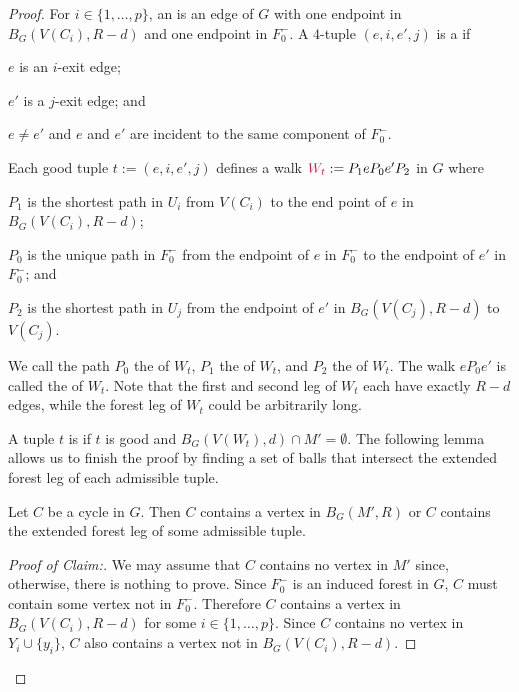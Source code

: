 \documentclass{patmorin}
\newcommand{\piotr}[1]{\textcolor{red}{Piotr: #1}}
\newenvironment{clmproof}{\begin{proof}[Proof of Claim:]\renewcommand{\qedsymbol}{\rule{1ex}{1ex}}}{\end{proof}}
\begin{document}
\begin{proof}
For $i\in\{1,\ldots,p\}$, an  is an edge of $G$ with one endpoint in $B_G(V(C_i),R-d)$ and one endpoint in $F_0^-$.
A $4$-tuple $(e,i,e',j)$ is a  if
\begin{compactitem}
  \item $e$ is an $i$-exit edge;
  \item $e'$ is a $j$-exit edge;
  and \item $e\neq e'$ and $e$ and $e'$ are incident to the same component of $F_0^-$.
\end{compactitem}
Each good tuple $t:=(e,i,e',j)$  defines a walk $\mathdefin{W_t}:=P_1eP_0e'P_2$ in $G$ where
\begin{compactitem}
  \item $P_1$ is the shortest path in $U_i$ from $V(C_i)$ to the end point of $e$ in $B_G(V(C_i),R-d)$;
  \item $P_0$ is the unique path in $F_0^-$ from the endpoint of $e$ in $F^-_0$ to the endpoint of $e'$ in $F^-_0$; and
  \item $P_2$ is the shortest path in $U_j$ from the endpoint of $e'$ in $B_G(V(C_j),R-d)$ to $V(C_j)$.
\end{compactitem}
We call the path $P_0$ the  of $W_t$, $P_1$ the  of $W_t$, and $P_2$ the  of $W_t$.  The walk $eP_0e'$ is called the  of $W_t$.  Note that the first and second leg of $W_t$ each have exactly $R-d$ edges, while the forest leg of $W_t$ could be arbitrarily long.

A tuple $t$ is  if $t$ is good and $B_G(V(W_t),d) \cap M' = \emptyset$.  The following lemma allows us to finish the proof by finding a set of balls that intersect the extended forest leg of each admissible tuple.

\begin{clm}\label{hit_cycle}
  Let $C$ be a cycle in $G$.  Then  $C$ contains a vertex in $B_G(M',R)$ or $C$ contains the extended forest leg of some admissible tuple.
\end{clm}

\begin{clmproof}
  We may assume that $C$ contains no vertex in $M'$ since, otherwise, there is nothing to prove.
  Since $F_0^-$ is an induced forest in $G$, $C$ must contain some vertex not in $F_0^-$.  Therefore $C$ contains a vertex in $B_G(V(C_i),R-d)$  for some $i\in\{1,\ldots,p\}$. Since $C$ contains no vertex in $Y_i\cup\{y_i\}$, $C$ also contains a vertex not in $B_G(V(C_i),R-d)$.


\end{clmproof}
\end{proof}
\end{document}
